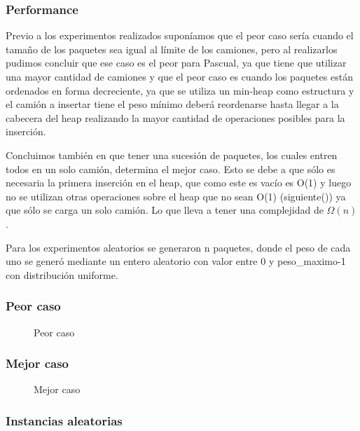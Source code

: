 \documentclass[a4paper, 10pt, twoside]{article}
\newcommand{\tresgraficos}[3]{
    \newcommand{\separacion}{-2.2em}
    \vspace{\separacion}
    
    \vspace{\separacion}
    
    \vspace{\separacion}
    
}
\begin{document}
\subsubsection{Performance}

Previo a los experimentos realizados suponíamos que el peor caso sería cuando el tamaño de los paquetes sea igual al límite de los camiones, pero al realizarlos pudimos concluir que ese caso es el peor para Pascual, ya que tiene que utilizar una mayor cantidad de camiones y que el peor caso es cuando los paquetes están ordenados en forma decreciente, ya que se utiliza un min-heap como estructura y el camión a insertar tiene el peso mínimo
deberá reordenarse hasta llegar a la cabecera del heap realizando la mayor cantidad de operaciones posibles para la inserción.

Concluimos también en que tener una sucesión de paquetes, los cuales entren todos en un solo camión, determina el mejor caso. Esto se debe a que sólo es necesaria la primera inserción en el heap, que como este es vacío es O(1) y luego no se utilizan otras operaciones sobre el heap que no sean O(1) (siguiente()) ya que sólo se carga un solo camión. Lo que lleva a tener una complejidad de $\Omega(n)$.

Para los experimentos aleatorios se generaron n paquetes, donde el peso de cada uno se generó mediante un entero aleatorio con valor entre 0 y peso\_maximo-1 con distribución uniforme. 

\subsubsection{Peor caso}

\begin{figure}[H]
  \centering
  \tresgraficos{problema1-peor-caso}
               {problema1-peor-caso-logn}
               {problema1-peor-caso-n}               
  \caption{Peor caso}
\end{figure}


\subsubsection{Mejor caso}

\begin{figure}[H]
  \centering
  \tresgraficos{problema1-mejor-caso}
               {problema1-mejor-caso-logn}
               {problema1-mejor-caso-n}
  \caption{Mejor caso}
\end{figure}


\subsubsection{Instancias aleatorias}
\end{document}
